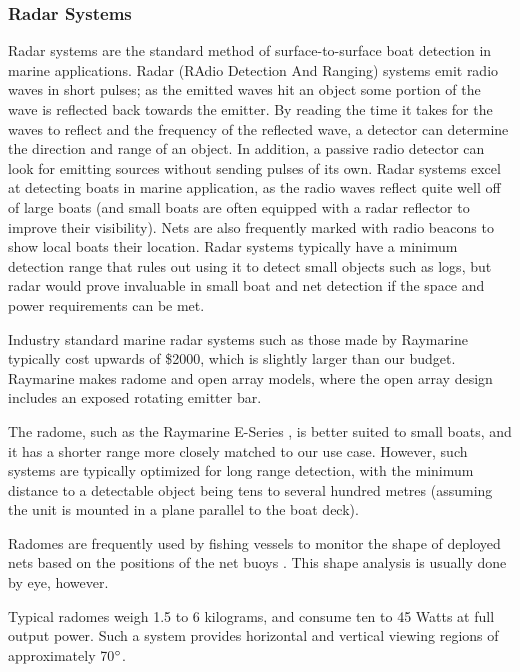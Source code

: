\subsubsection{\label{sec:intro:technical-background:radar}Radar Systems}
Radar systems are the standard method of surface-to-surface boat detection in marine applications. Radar (RAdio Detection And Ranging) systems emit radio waves in short pulses; as the emitted waves hit an object some portion of the wave is reflected back towards the emitter. By reading the time it takes for the waves to reflect and the frequency of the reflected wave, a detector can determine the direction and range of an object. In addition, a passive radio detector can look for emitting sources without sending pulses of its own. Radar systems excel at detecting boats in marine application, as the radio waves reflect quite well off of large boats (and small boats are often equipped with a radar reflector to improve their visibility). Nets are also frequently marked with radio beacons to show local boats their location. Radar systems typically have a minimum detection range that rules out using it to detect small objects such as logs, but radar would prove invaluable in small boat and net detection if the space and power requirements can be met.

Industry standard marine radar systems such as those made by Raymarine typically cost upwards of \$2000, which is slightly larger than our budget. Raymarine makes radome and open array models, where the open array design includes an exposed rotating emitter bar.

The radome, such as the Raymarine E-Series \cite{raymarine-eseries}, is better suited to small boats, and it has a shorter range more closely matched to our use case. However, such systems are typically optimized for long range detection, with the minimum distance to a detectable object being tens to several hundred metres (assuming the unit is mounted in a plane parallel to the boat deck).

Radomes are frequently used by fishing vessels to monitor the shape of deployed nets based on the positions of the net buoys \cite{furuno__marine-radar-guide}. This shape analysis is usually done by eye, however.

Typical radomes weigh 1.5 to 6 kilograms, and consume ten to 45 Watts at full output power. Such a system provides horizontal and vertical viewing regions of approximately 70$\degree$.


